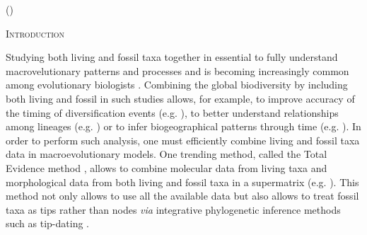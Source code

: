 \documentclass[12pt,letterpaper]{article}
\renewcommand{\section}[1]{%
\bigskip
\begin{center}
\begin{Large}
\normalfont\scshape #1
\medskip
\end{Large}
\end{center}}
\begin{document}
\noindent ()\\

\vspace{1.5in}

\newpage 

%
%

\section{Introduction}
Studying both living and fossil taxa together in essential to fully understand macrovelutionary patterns and processes and is becoming increasingly common among evolutionary biologists \cite{jacksonwhat2006,quentaldiversity2010,dietlconservation2011,slaterunifying2013,fritzdiversity2013,Wood01032013}. Combining the global biodiversity by including both living and fossil in such studies allows, for example, to improve accuracy of the timing of diversification events (e.g. \cite{ronquista2012}), to better understand relationships among lineages (e.g. \cite{beckancient2014}) or to infer biogeographical patterns through time (e.g. \cite{Meseguer01032015}). %
In order to perform such analysis, one must efficiently combine living and fossil taxa data in macroevolutionary models. One trending method, called the Total Evidence method \cite{eernissetaxonomic1993,ronquista2012}, allows to combine molecular data from living taxa and morphological data from both living and fossil taxa in a supermatrix (e.g. \cite{pyrondivergence2011,ronquista2012,schragocombining2013,slaterunifying2013,beckancient2014,Meseguer01032015}). This method not only allows to use all the available data but also allows to treat fossil taxa as tips rather than nodes \textit{via} integrative phylogenetic inference methods such as tip-dating \cite{ronquista2012,Drummond01082012,Wood01032013,BEASTmaster}.
\end{document}
